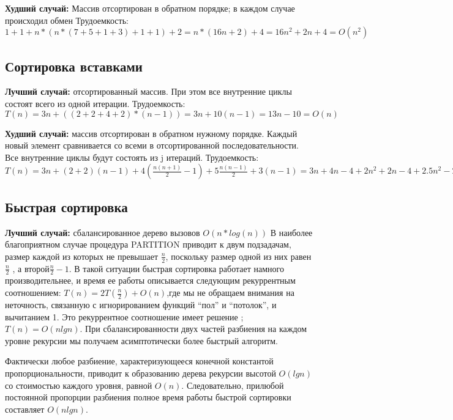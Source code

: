 \documentclass[12pt]{report}
\begin{document}
	\textbf{Худший случай:}  Массив отсортирован в обратном порядке; в каждом случае происходил обмен\newline
	Трудоемкость: $1 + 1 +  n*(n* (7 + 5 + 1  + 3)  + 1 + 1) + 2 =  n*(16n + 2) + 4 = 16n^2 + 2n + 4 = O(n^2)$
	
	
	\subsection{Сортировка вставками}
	\hspace*{5mm}
	\textbf{Лучший случай:} отсортированный массив. При этом все внутренние циклы состоят всего из одной итерации.\newline
	Трудоемкость: $T(n) = 3n + ((2 + 2 + 4 + 2 ) * (n - 1))  =  3n + 10(n-1) = 13n - 10 = O(n)$
	
	\textbf{Худший случай:} массив отсортирован в обратном нужному порядке. Каждый новый элемент сравнивается со всеми в отсортированной последовательности.
	Все внутренние циклы будут состоять из j итераций. \newline
	Трудоемкость: $T(n) = 3n + (2 + 2)(n-1) + 4 \left({\frac {n(n+1)}{2}}-1\right)+5{\frac {n(n-1)}{2}}+3(n-1) = 3n + 4n - 4 + 2n^2
	+ 2n - 4 + 2.5n^2 - 2.5n + 3n - 3 = 4.5n^2 + 9.5n - 11 = O(n^{2})$
	
	\subsection{Быстрая сортировка}
	\hspace*{5mm}
	\textbf{Лучший случай:} сбалансированное дерево вызовов \(O(n*log(n))\)  
	В наиболее благоприятном случае процедура PARTITION приводит к двум подзадачам, размер каждой из которых не превышает $\frac{n}{2}$, поскольку размер одной из них равен $\frac{n}{2}$ , а второй$\frac{n}{2} - 1$. В такой ситуации быстрая сортировка работает намного производительнее, и время ее работы описывается следующим рекуррентным соотношением: $T(n) = 2T(\frac{n}{2}) + O(n)$,где мы не обращаем внимания на неточность, связанную с игнорированием функций “пол” и “потолок”, и вычитанием 1. Это рекуррентное соотношение имеет решение ; $T(n) =O(nlgn)$. При сбалансированности двух частей разбиения на каждом уровне рекурсии мы получаем асимптотически более быстрый алгоритм.
	
	Фактически любое разбиение, характеризующееся конечной константой пропорциональности, приводит к образованию дерева рекурсии высотой $O(lgn)$ со стоимостью каждого уровня, равной $O(n)$. Следовательно, прилюбой постоянной пропорции разбиения полное время работы быстрой сортировки составляет $O(nlgn)$.
	
\end{document}
